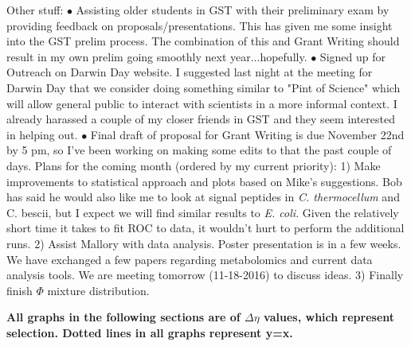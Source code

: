\documentclass[11pt]{labbook}
\begin{document}
Other stuff: \newline
$\bullet$ Assisting older students in GST with their preliminary exam by providing feedback on proposals/presentations. This has given me some insight into the GST prelim process. The combination of this and Grant Writing should result in my own prelim going smoothly next year...hopefully. \newline
$\bullet$ Signed up for Outreach on Darwin Day website. I suggested last night at the meeting for Darwin Day that we consider doing something similar to "Pint of Science" which will allow general public to interact with scientists in a more informal context. I already harassed a couple of my closer friends in GST and they seem interested in helping out.
$\bullet$ Final draft of proposal for Grant Writing is due November 22nd by 5 pm, so I've been working on making some edits to that the past couple of days.
\newline
Plans for the coming month (ordered by my current priority):
1) Make improvements to statistical approach and plots based on Mike's suggestions. Bob has said he would also like me to look at signal peptides in \textit{C. thermocellum} and {C. bescii}, but I expect we will find similar results to \textit{E. coli}. Given the relatively short time it takes to fit ROC to data, it wouldn't hurt to perform the additional runs.   
2) Assist Mallory with data analysis. Poster presentation is in a few weeks. We have exchanged a few papers regarding metabolomics and current data analysis tools. We are meeting tomorrow (11-18-2016) to discuss ideas.
3) Finally finish $\Phi$ mixture distribution. 

\textbf{All graphs in the following sections are of $\Delta\eta$ values, which represent selection. Dotted lines in all graphs represent y=x.}
\end{document}
